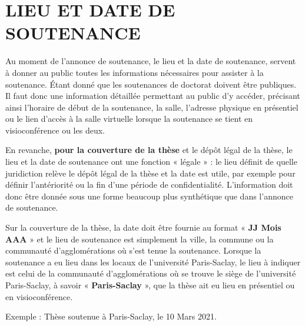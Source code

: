 \documentclass[main=french,a4paper]{book}
\begin{document}
\section{LIEU ET DATE DE SOUTENANCE}
Au moment de l’annonce de soutenance, le lieu et la date de soutenance, servent à donner au public toutes les informations nécessaires pour assister à la soutenance. Étant donné que les soutenances de doctorat doivent être publiques. Il faut donc une information détaillée permettant au public d’y accéder, précisant ainsi l’horaire de début de la soutenance, la salle, l’adresse physique en présentiel ou le lien d’accès à la salle virtuelle lorsque la soutenance se tient en visioconférence ou les deux.\\ \par
En revanche, \textbf{pour la couverture de la thèse} et le dépôt légal de la thèse, le lieu et la date de soutenance ont une fonction « légale » : le lieu définit de quelle juridiction relève le dépôt légal de la thèse et la date est utile, par exemple pour définir l’antériorité ou la fin d’une période de confidentialité. L’information doit donc être donnée sous une forme beaucoup plus synthétique que dans l’annonce de soutenance.\\ \par
Sur la couverture de la thèse, la date doit être fournie au format « \textbf{JJ Mois AAA} » et le lieu de soutenance est simplement la ville, la commune ou la communauté d’agglomérations où s’est tenue la soutenance. Lorsque la soutenance a eu lieu dans les locaux de l’université Paris-Saclay, le lieu à indiquer est celui de la communauté d’agglomérations où se trouve le siège de l’université Paris-Saclay, à savoir « \textbf{Paris-Saclay} », que la thèse ait eu lieu en présentiel ou en visioconférence.\\ \par
Exemple : Thèse soutenue à Paris-Saclay,  le 10 Mars 2021.
\end{document}
